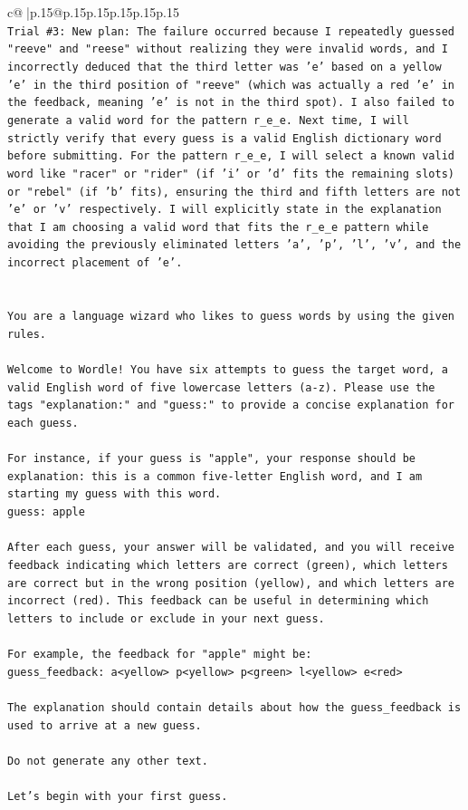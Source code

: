 \documentclass{article}
\begin{document}
{\begin{supertabular}{c@{$\;$}|p{.15\linewidth}@{}p{.15\linewidth}p{.15\linewidth}p{.15\linewidth}p{.15\linewidth}p{.15\linewidth}}
{{{\\ 
\texttt{Trial \#3: New plan: The failure occurred because I repeatedly guessed "reeve" and "reese" without realizing they were invalid words, and I incorrectly deduced that the third letter was 'e' based on a yellow 'e' in the third position of "reeve" (which was actually a red 'e' in the feedback, meaning 'e' is not in the third spot). I also failed to generate a valid word for the pattern r\_e\_e. Next time, I will strictly verify that every guess is a valid English dictionary word before submitting. For the pattern r\_e\_e, I will select a known valid word like "racer" or "rider" (if 'i' or 'd' fits the remaining slots) or "rebel" (if 'b' fits), ensuring the third and fifth letters are not 'e' or 'v' respectively. I will explicitly state in the explanation that I am choosing a valid word that fits the r\_e\_e pattern while avoiding the previously eliminated letters 'a', 'p', 'l', 'v', and the incorrect placement of 'e'.} \\
\\ 
\\ 
\texttt{You are a language wizard who likes to guess words by using the given rules.} \\
\\ 
\texttt{Welcome to Wordle! You have six attempts to guess the target word, a valid English word of five lowercase letters (a{-}z). Please use the tags "explanation:" and "guess:" to provide a concise explanation for each guess.} \\
\\ 
\texttt{For instance, if your guess is "apple", your response should be} \\
\texttt{explanation: this is a common five{-}letter English word, and I am starting my guess with this word.} \\
\texttt{guess: apple} \\
\\ 
\texttt{After each guess, your answer will be validated, and you will receive feedback indicating which letters are correct (green), which letters are correct but in the wrong position (yellow), and which letters are incorrect (red). This feedback can be useful in determining which letters to include or exclude in your next guess.} \\
\\ 
\texttt{For example, the feedback for "apple" might be:} \\
\texttt{guess\_feedback: a<yellow> p<yellow> p<green> l<yellow> e<red>} \\
\\ 
\texttt{The explanation should contain details about how the guess\_feedback is used to arrive at a new guess.} \\
\\ 
\texttt{Do not generate any other text.} \\
\\ 
\texttt{Let's begin with your first guess.} \\
            }
        }
    }
     \\ \\


\end{supertabular}}
\end{document}

